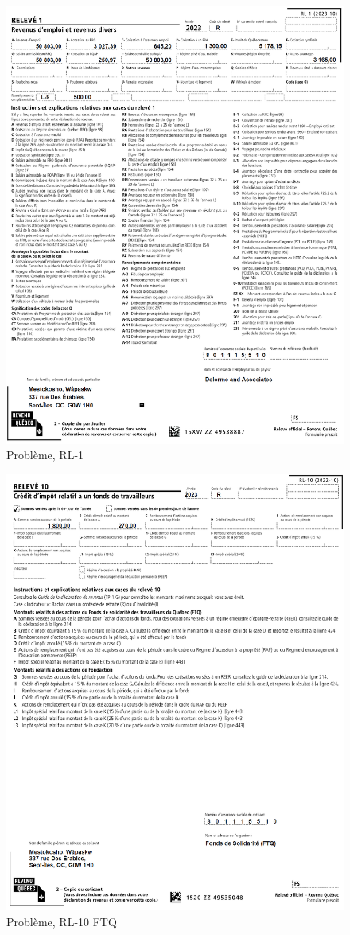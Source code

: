 \begin{figure}
	\centering
	\includegraphics[width=.9\textwidth]{probleme/chapitre-5/Wapaskw-RL1.png}
	\caption[]{Problème, RL-1}
	\label{fig:chap5ProblemeRL1}
\end{figure}
\begin{figure}
	\centering
	\includegraphics[width=.9\textwidth]{probleme/chapitre-5/Wapaskw-RL10-FTQ.png}
	\caption[]{Problème, RL-10 FTQ}
	\label{fig:chap5ProblemeRL10FTQ}
\end{figure}
